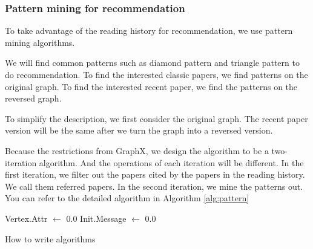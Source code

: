 \subsubsection{Pattern mining for recommendation}

To take advantage of the reading history for recommendation, we use pattern mining algorithms. 

We will find common patterns such as diamond pattern and triangle pattern to do recommendation. To find the interested classic papers, we find patterns on the original graph. To find the interested recent paper, we find the patterns on the reversed graph.

To simplify the description, we first consider the original graph. The recent paper version will be the same after we turn the graph into a reversed version.

Because the restrictions from GraphX, we design the algorithm to be a two-iteration algorithm. And the operations of each iteration will be different. In the first iteration, we filter out the papers cited by the papers in the reading history. We call them referred papers. In the second iteration, we mine the patterns out. You can refer to the detailed algorithm in Algorithm \ref{alg:pattern}

\begin{algorithm}
	{Vertex.Attr $\gets$ 0.0}
Init.Message $\gets$ 0.0

 \caption{How to write algorithms}
 \label{alg:pattern}
\end{algorithm}





